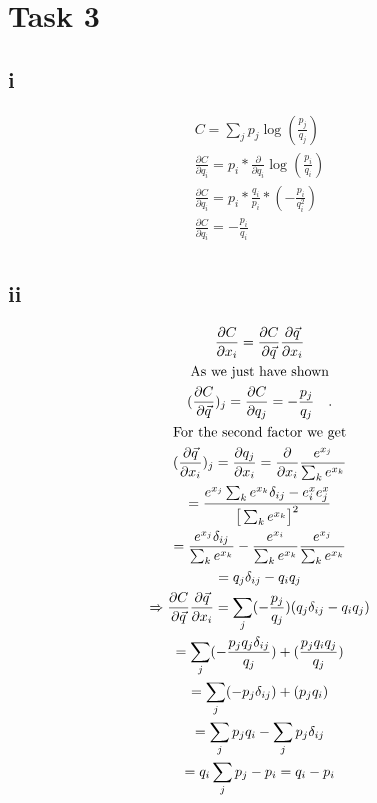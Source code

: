 \section*{Task 3}
\subsection*{i}

\begin{gather*}
C = \sum_j p_j \log(\frac{p_j}{q_j}) \\
\frac{\partial C}{\partial q_i} = p_i * \frac{\partial}{\partial q_i} \log(\frac{p_i}{q_i}) \\
\frac{\partial C}{\partial q_i} = p_i * \frac{q_i}{p_i} * (-\frac{p_i}{q_i^2}) \\
\frac{\partial C}{\partial q_i} = -\frac{p_i}{q_i} \\
\end{gather*}

\subsection*{ii}
\begin{gather*}
\frac{\partial C}{\partial x_i} = \frac{\partial C}{\partial \vec{q}} \frac{\partial \vec{q}}{\partial x_i} \\
\text{As we just have shown}\\
(\frac{\partial C}{\partial \vec{q}})_j = \frac{\partial C}{\partial q_j} = -\frac{p_j}{q_j} \quad .\\
\text{For the second factor we get} \\
(\frac{\partial \vec{q}}{\partial x_i})_j = \frac{\partial q_j}{\partial x_i} = \frac{\partial}{\partial x_i} \frac{e^{x_j}}{\sum_k e^{x_k}} \\
= \frac{e^{x_j} \sum_k e^{x_k} \delta_{ij} - e^x_i e^x_j}{\big[ \sum_k e^{x_k} \big]^2} \\
= \frac{e^{x_j} \delta_{ij}}{\sum_k e^{x_k}} - \frac{e^{x_i}}{\sum_k e^{x_k}} \frac{e^{x_j}}{\sum_k e^{x_k}} \\
= q_j \delta_{ij} - q_i q_j \\
\xRightarrow[]{}
\frac{\partial C}{\partial \vec{q}} \frac{\partial \vec{q}}{\partial x_i} = \sum_j (-\frac{p_j}{q_j})(q_j \delta_{ij} - q_iq_j) \\
= \sum_j (-\frac{p_j q_j \delta_{ij}}{q_j})+(\frac{p_j q_iq_j}{q_j}) \\
= \sum_j (-p_j \delta_{ij})+(p_j q_i)\\
= \sum_j p_jq_i - \sum_j p_j \delta_{ij} \\
= q_i \sum_j p_j - p_i
= q_i - p_i
\end{gather*}

